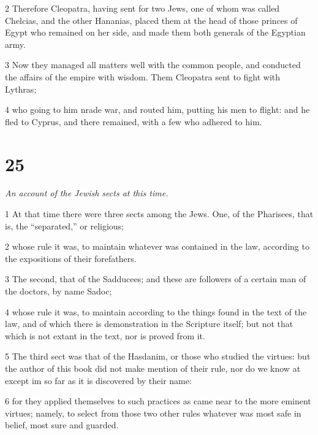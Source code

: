 \par 2 Therefore Cleopatra, having sent for two Jews, one of whom was called Chelcias, and the other Hananias, placed them at the head of those princes of Egypt who remained on her side, and made them both generals of the Egyptian army. 

\par 3 Now they managed all matters well with the common people, and conducted the affairs of the empire with wisdom. Them Cleopatra sent to fight with Lythras; 

\par 4 who going to him nrade war, and routed him, putting his men to flight: and he fled to Cyprus, and there remained, with a few who adhered to him. 

\chapter{25}

\par \textit{An account of the Jewish sects at this time.}

\par 1 At that time there were three sects among the Jews. One, of the Pharisees, that is, the “separated,” or religious; 

\par 2 whose rule it was, to maintain whatever was contained in the law, according to the expositions of their forefathers. 

\par 3 The second, that of the Sadducees; and these are followers of a certain man of the doctors, by name Sadoc; 

\par 4 whose rule it was, to maintain according to the things found in the text of the law, and of which there is demonstration in the Scripture itself; but not that which is not extant in the text, nor is proved from it. 

\par 5 The third sect was that of the Hasdanim, or those who studied the virtues: but the author of this book did not make mention of their rule, nor do we know at except im so far as it is discovered by their name: 

\par 6 for they applied themselves to such practices as came near to the more eminent virtues; namely, to select from those two other rules whatever was most safe in belief, most sure and guarded. 

